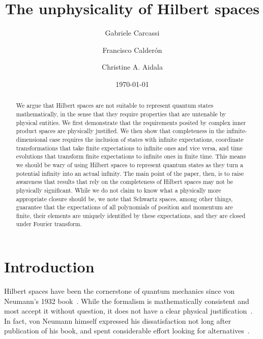 \documentclass[10pt,twocolumn, nofootinbib]{revtex4-2}
\begin{document}
\title{The unphysicality of Hilbert spaces}
\author{Gabriele Carcassi}
\author{Francisco Calder\'on}
\author{Christine A. Aidala}

\date{\today}


\begin{abstract}
We argue that Hilbert spaces are not suitable to represent quantum states mathematically, in the sense that they require properties that are untenable by physical entities. We first demonstrate that the requirements posited by complex inner product spaces are physically justified. We then show that completeness in the infinite-dimensional case requires the inclusion of states with infinite expectations, coordinate transformations that take finite expectations to infinite ones and vice versa, and time evolutions that transform finite expectations to infinite ones in finite time. This means we should be wary of using Hilbert spaces to represent quantum states as they turn a potential infinity into an actual infinity. The main point of the paper, then, is to raise awareness that results that rely on the completeness of Hilbert spaces may not be physically significant. While we do not claim to know what a physically more appropriate closure should be, we note that Schwartz spaces, among other things, guarantee that the expectations of all polynomials of position and momentum are finite, their elements are uniquely identified by these expectations, and they are closed under Fourier transform.  

\end{abstract}

\maketitle

\section{Introduction}

Hilbert spaces have been the cornerstone of quantum mechanics since von Neumann's 1932 book~\cite{von_neumann_mathematische_1996}. While the formalism is mathematically consistent and most accept it without question, it does not have a clear physical justification~\cite{heathcote_1990, hardy_2001}. In fact, von Neumann himself expressed his dissatisfaction not long after publication of his book, and spent considerable effort looking for alternatives~\cite{vonNeumannHilbert_1996}.
\end{document}
